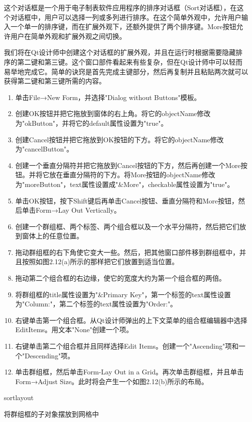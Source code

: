 \documentclass[11pt,oneside]{book}
\begin{document}
\begin{common-format}
这个对话框是一个用于电子制表软件应用程序的排序对话框（Sort对话框），在这个对话框中，用户可以选择一列或多列进行排序。在这个简单外观中，允许用户输入一个单一的排序键，而在扩展外观下，还额外提供了两个排序键。More按钮允许用户在简单外观和扩展外观之间切换。

我们将在Qt设计师中创建这个对话框的扩展外观，并且在运行时根据需要隐藏排序的第二键和第三键。这个窗口部件看起来有些复杂，但在Qt设计师中可以轻而易举地完成它。简单的诀窍是首先完成主键部分，然后再复制并且粘贴两次就可以获得第二键和第三键所需的内容。

\begin{enumerate}
\item 单击File→New Form，并选择"Dialog without Buttons"模板。
\item 创建OK按钮并把它拖放到窗体的右上角。将它的objectName修改为"okButton"，并将它的default属性设置为"true"。
\item 创建Cancel按钮并把它拖放到OK按钮的下方。将它的objectName修改为"cancelButton"。
\item 创建一个垂直分隔符并把它拖放到Cancel按钮的下方，然后再创建一个More按钮。并将它放在垂直分隔符的下方。将More按钮的objectName修改为"moreButton"，text属性设置成"\&{}More"，checkable属性设置为"true"。
\item 单击OK按钮，按下Shift键后再单击Cancel按钮、垂直分隔符和More按钮，然后单击Form→Lay Out Vertically。
\item 创建一个群组框、两个标签、两个组合框以及一个水平分隔符，然后把它们放到窗体上的任意位置。
\item 拖动群组框的右下角使它变大一些。然后，把其他窗口部件移到群组框中，并且按照如图2.12(a)所示的那样把它们放置到适当位置。
\item 拖动第二个组合框的右边缘，使它的宽度大约为第一个组合框的两倍。
\item 将群组框的title属性设置为"\&{}Primary Key"，第一个标签的text属性设置为"Column:"，第二个标签的text属性设置为"Order:"。
\item 右键单击第一个组合框。从Qt设计师弹出的上下文菜单的组合框编辑器中选择EditItems。用文本"None"创建一个项。
\item 右键单击第二个组合框并且同样选择Edit Items。创建一个"Ascending"项和一个"Descending"项。
\item 单击群组框，然后单击Form-Lay Out in a Grid。再次单击群组框，并且单击Form→Adjust Size。此时将会产生一个如图2.12(b)所示的布局。
\end{enumerate}

\begin{linefig}[0.8]{sortlayout}
\caption{将群组框的子对象摆放到网格中}
\label{fig:sortlayout}
\end{linefig}


\end{common-format}
\end{document}
